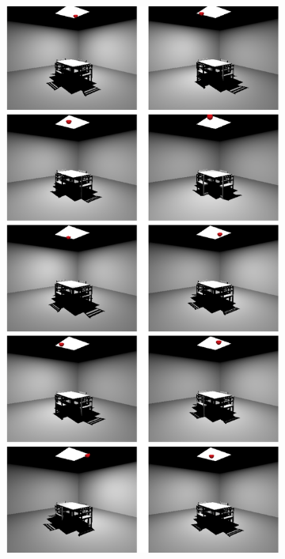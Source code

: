 \begin{figure}
\begin{fullwidth}
	\begin{subfigure}[b]{0.38\thewidth}
		\includegraphics[width=1.0\textwidth]{figures/ir/ir-1-1}

\end{subfigure}
\end{fullwidth}
\end{figure}
